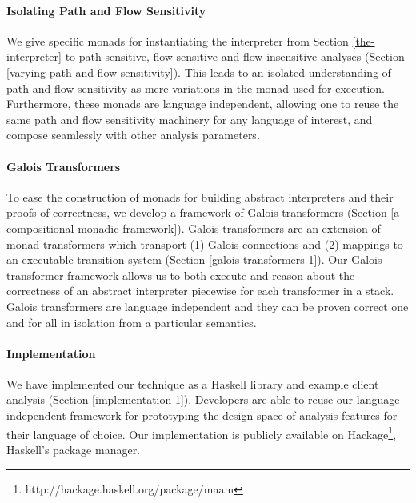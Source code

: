 \par

\paragraph{Isolating Path and Flow Sensitivity}

We give specific monads for instantiating the interpreter from Section
\ref{the-interpreter} to path-sensitive, flow-sensitive and
flow-insensitive analyses (Section
\ref{varying-path-and-flow-sensitivity}). This leads to an isolated
understanding of path and flow sensitivity as mere variations in the
monad used for execution. Furthermore, these monads are language
independent, allowing one to reuse the same path and flow sensitivity
machinery for any language of interest, and compose seamlessly with
other analysis parameters.

\par

\paragraph{Galois Transformers}

To ease the construction of monads for building abstract interpreters
and their proofs of correctness, we develop a framework of Galois
transformers (Section \ref{a-compositional-monadic-framework}). Galois
transformers are an extension of monad transformers which transport (1)
Galois connections and (2) mappings to an executable transition system
(Section \ref{galois-transformers-1}). Our Galois transformer framework
allows us to both execute and reason about the correctness of an
abstract interpreter piecewise for each transformer in a stack. Galois
transformers are language independent and they can be proven correct one
and for all in isolation from a particular semantics.

\par

\paragraph{Implementation}

We have implemented our technique as a Haskell library and example
client analysis (Section \ref{implementation-1}). Developers are able to
reuse our language-independent framework for prototyping the design
space of analysis features for their language of choice. Our
implementation is publicly available on Hackage\footnote{
http://hackage.haskell.org/package/maam
}, Haskell's package manager.


